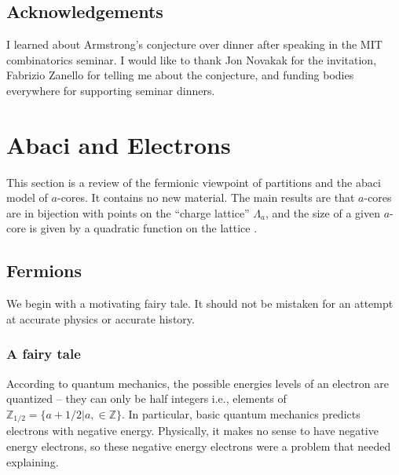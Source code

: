 \documentclass{amsart}[12pt]
\theoremstyle{definition}
\newtheorem{definition}[dummy]{Definition}
\newcommand{\Z}{\mathbb{Z}}
\newcommand{\R}{\mathbb{R}}
\begin{document}
\subsection{Acknowledgements}
I learned about Armstrong's conjecture over dinner after speaking in the MIT combinatorics seminar. I would like to thank Jon Novakak for the invitation, Fabrizio Zanello for telling me about the conjecture, and funding bodies everywhere for supporting seminar dinners.








\section{Abaci and Electrons} \label{sec:abacus}

This section is a review of the fermionic viewpoint of partitions and the abaci model of $a$-cores.  It contains no new material.  The main results are that $a$-cores are in bijection with points on the ``charge lattice'' $\Lambda_a$, and the size of a given $a$-core is given by a quadratic function on the lattice
.


\subsection{Fermions}
 We begin with a motivating fairy tale. It should not be mistaken for an attempt at accurate physics or accurate history.


\subsubsection{A fairy tale}
According to quantum mechanics, the possible energies levels of an electron are quantized -- they can only be half integers i.e., elements of $\Z_{1/2}=\{a+1/2|a,\in\Z\}$.  In particular, basic quantum mechanics predicts electrons with negative energy.  Physically, it makes no sense to have negative energy electrons, so these negative energy electrons were a problem that needed explaining.
\end{document}
